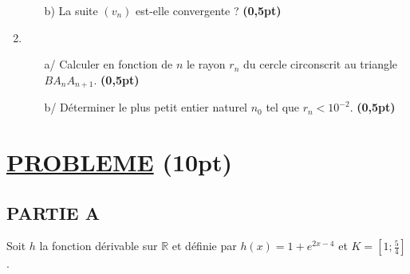 \documentclass[12pt]{article}
\begin{document}
\begin{enumerate}
\begin{enumerate}
        \item[b)] La suite \( (v_n) \) est-elle convergente ? \hfill \textbf{(0,5pt)}
    \end{enumerate}
    
    \item 
    \begin{enumerate}
        \item[a/] Calculer en fonction de \( n \) le rayon \( r_n \) du cercle circonscrit au triangle \( B A_n A_{n+1} \). \hfill \textbf{(0,5pt)}
        
        \item[b/] Déterminer le plus petit entier naturel \( n_0 \) tel que \( r_n < 10^{-2} \). \hfill \textbf{(0,5pt)}
    \end{enumerate}
\end{enumerate}


\section*{\underline{PROBLEME} \hfill (10pt)}

\subsection*{PARTIE A}

Soit \( h \) la fonction dérivable sur \( \mathbb{R} \) et définie par \( h(x) = 1 + e^{2x - 4} \) et \( K = \left[1 ; \frac{5}{4} \right] \).
\end{document}
